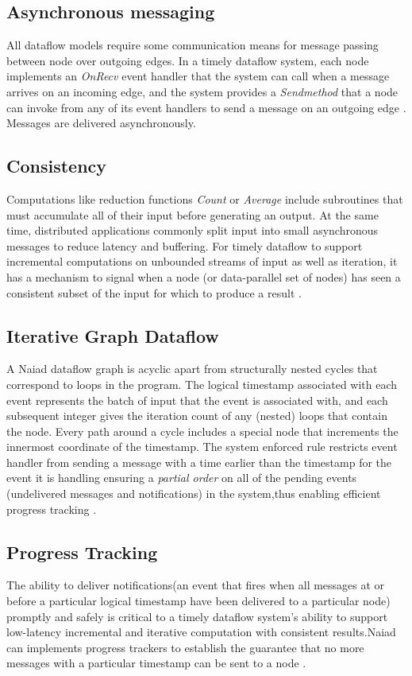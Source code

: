 \documentclass[9pt,twocolumn,twoside]{../../styles/osajnl}
\begin{document}
\subsection{Asynchronous messaging}
All dataflow models require some communication means for message
passing between node over outgoing edges. In a timely dataflow system,
each node implements an \textit{OnRecv} event handler that the system
can call when a message arrives on an incoming edge, and the system
provides a \textit{Sendmethod} that a node can invoke from any of its
event handlers to send a message on an outgoing edge
\cite{paper3-Naiad}. Messages are delivered asynchronously.

\subsection{Consistency}
Computations like reduction functions \textit{Count} or
\textit{Average} include subroutines that must accumulate all of their
input before generating an output. At the same time, distributed
applications commonly split input into small asynchronous messages to
reduce latency and buffering. For timely dataflow to support
incremental computations on unbounded streams of input as well as
iteration, it has a mechanism to signal when a node (or data-parallel
set of nodes) has seen a consistent subset of the input for which to
produce a result \cite{paper3-Naiad}.

\subsection{Iterative Graph Dataflow}
A Naiad dataflow graph is acyclic apart from structurally nested
cycles that correspond to loops in the program. The logical timestamp
associated with each event represents the batch of input that the
event is associated with, and each subsequent integer gives the
iteration count of any (nested) loops that contain the node. Every
path around a cycle includes a special node that increments the
innermost coordinate of the timestamp.  The system enforced rule
restricts event handler from sending a message with a time earlier
than the timestamp for the event it is handling ensuring a
\textit{partial order} on all of the pending events (undelivered
messages and notifications) in the system,thus enabling efficient
progress tracking \cite{paper1-Naiad}.


\subsection{Progress Tracking}
The ability to deliver notifications(an event that fires when all
messages at or before a particular logical timestamp have been
delivered to a particular node) promptly and safely is critical to a
timely dataflow system's ability to support low-latency incremental
and iterative computation with consistent results.Naiad can implements \GE
progress trackers to establish the guarantee that no more messages
with a particular timestamp can be sent to a node \cite{paper1-Naiad}.
\end{document}
